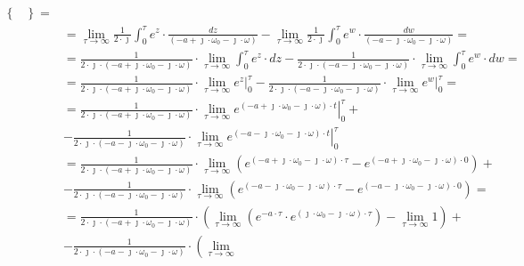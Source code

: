 \begin{task}
\begin{align*}
\begin{Bmatrix}
\end{Bmatrix}=\\
&=\lim_{\tau \rightarrow \infty }\frac{1}{2 \cdot \jmath}
\int_{0}^{\tau} e^{z} \cdot \frac{dz}{(-a + \jmath \cdot \omega_{0} -\jmath \cdot \omega)}
-\lim_{\tau \rightarrow \infty }\frac{1}{2 \cdot \jmath}
\int_{0}^{\tau} e^{w} \cdot \frac{dw}{(-a - \jmath \cdot \omega_{0} -\jmath \cdot \omega)}=\\
&=\frac{1}{2 \cdot \jmath \cdot (-a + \jmath \cdot \omega_{0} -\jmath \cdot \omega)} \cdot \lim_{\tau \rightarrow \infty }
\int_{0}^{\tau} e^{z} \cdot dz
-\frac{1}{2 \cdot \jmath \cdot (-a - \jmath \cdot \omega_{0} -\jmath \cdot \omega)} \cdot \lim_{\tau \rightarrow \infty }
\int_{0}^{\tau} e^{w} \cdot dw=\\
&=\frac{1}{2 \cdot \jmath \cdot (-a + \jmath \cdot \omega_{0} -\jmath \cdot \omega)} \cdot \lim_{\tau \rightarrow \infty }
\left. e^{z}\right|_{0}^{\tau}
-\frac{1}{2 \cdot \jmath \cdot (-a - \jmath \cdot \omega_{0} -\jmath \cdot \omega)} \cdot \lim_{\tau \rightarrow \infty }
\left. e^{w}\right|_{0}^{\tau}=\\
&=\frac{1}{2 \cdot \jmath \cdot (-a + \jmath \cdot \omega_{0} -\jmath \cdot \omega)} \cdot \lim_{\tau \rightarrow \infty }
\left. e^{(-a + \jmath \cdot \omega_{0} -\jmath \cdot \omega) \cdot t}\right|_{0}^{\tau}+\\
&-\frac{1}{2 \cdot \jmath \cdot (-a - \jmath \cdot \omega_{0} -\jmath \cdot \omega)} \cdot \lim_{\tau \rightarrow \infty }
\left. e^{(-a - \jmath \cdot \omega_{0} -\jmath \cdot \omega) \cdot t}\right|_{0}^{\tau}\\
&=\frac{1}{2 \cdot \jmath \cdot (-a + \jmath \cdot \omega_{0} -\jmath \cdot \omega)} \cdot \lim_{\tau \rightarrow \infty }
\left( e^{(-a + \jmath \cdot \omega_{0} -\jmath \cdot \omega) \cdot \tau}-e^{(-a + \jmath \cdot \omega_{0} -\jmath \cdot \omega) \cdot 0} \right)+\\
&-\frac{1}{2 \cdot \jmath \cdot (-a - \jmath \cdot \omega_{0} -\jmath \cdot \omega)} \cdot \lim_{\tau \rightarrow \infty }
\left( e^{(-a - \jmath \cdot \omega_{0} -\jmath \cdot \omega) \cdot \tau}-e^{(-a - \jmath \cdot \omega_{0} -\jmath \cdot \omega) \cdot 0} \right)=\\
&=\frac{1}{2 \cdot \jmath \cdot (-a + \jmath \cdot \omega_{0} -\jmath \cdot \omega)} \cdot \left(\lim_{\tau \rightarrow \infty }
\left( e^{-a \cdot \tau} \cdot e^{(\jmath \cdot \omega_{0} -\jmath \cdot \omega) \cdot \tau} \right)-\lim_{\tau \rightarrow \infty }1\right)+\\
&-\frac{1}{2 \cdot \jmath \cdot (-a - \jmath \cdot \omega_{0} -\jmath \cdot \omega)} \cdot \left(\lim_{\tau \rightarrow \infty }

\end{align*}
\end{task}
